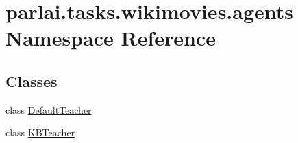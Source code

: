 \hypertarget{namespaceparlai_1_1tasks_1_1wikimovies_1_1agents}{}\section{parlai.\+tasks.\+wikimovies.\+agents Namespace Reference}
\label{namespaceparlai_1_1tasks_1_1wikimovies_1_1agents}
\subsection*{Classes}
\begin{DoxyCompactItemize}
\item 
class \hyperlink{classparlai_1_1tasks_1_1wikimovies_1_1agents_1_1DefaultTeacher}{Default\+Teacher}
\item 
class \hyperlink{classparlai_1_1tasks_1_1wikimovies_1_1agents_1_1KBTeacher}{K\+B\+Teacher}
\end{DoxyCompactItemize}
